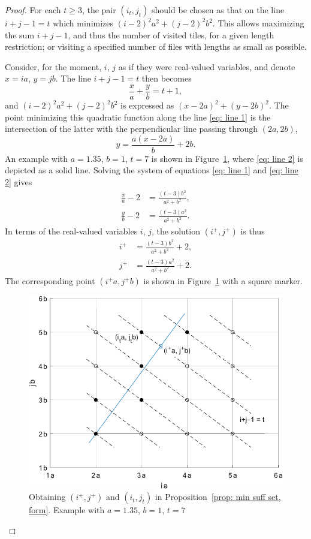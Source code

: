 \documentclass[12pt, a4paper]{article}
\newcommand{\tiles}{t} %
\newcommand{\isolr}{i^+}
\newcommand{\jsolr}{j^+}
\begin{document}
\begin{proof}
For each $\tiles \geq 3$, the pair $(i_\tiles,j_\tiles)$ should be chosen as that on the line $i+j-1=\tiles$ which minimizes $(i-2)^2 a^2 + (j-2)^2 b^2$. This allows maximizing the sum $i+j-1$, and thus the number of visited tiles, for a given length restriction; or visiting a specified number of files with lengths as small as possible.

Consider, for the moment, $i$, $j$ as if they were real-valued variables, and denote $x=ia$, $y=jb$. The line $i+j-1 = \tiles$ then becomes
\begin{equation}
\label{eq: line 1}
\frac x a + \frac y b = \tiles + 1,
\end{equation}
and $(i-2)^2 a^2 + (j-2)^2 b^2$ is expressed as $(x-2a)^2+(y-2b)^2$. The point minimizing this quadratic function along the line \eqref{eq: line 1} is the intersection of the latter with the perpendicular line passing through $(2a,2b)$,
\begin{equation}
\label{eq: line 2}
y = \frac {a (x-2a)} b + 2b.
\end{equation}
An example with $a=1.35$, $b=1$, $\tiles=7$ is shown in Figure~\ref{fig: min suff set, form}, where \eqref{eq: line 2} is depicted as a solid line. Solving the system of equations \eqref{eq: line 1} and \eqref{eq: line 2} gives 
\begin{align}
\frac x a - 2 &= \frac{(\tiles-3)b^2}{a^2+b^2}, \\
\frac y b - 2 &= \frac{(\tiles-3)a^2}{a^2+b^2}.
\end{align}
In terms of the real-valued variables $i$, $j$, the solution $(\isolr, \jsolr)$ is thus
\begin{align}
\label{eq: prop: min suff set, form: isolr}
\isolr &= \frac{(\tiles-3)b^2}{a^2+b^2} + 2, \\
\label{eq: prop: min suff set, form: jsolr}
\jsolr &= \frac{(\tiles-3)a^2}{a^2+b^2} + 2.
\end{align}
The corresponding point $(\isolr a, \jsolr b)$ is shown in Figure~\ref{fig: min suff set, form} with a square marker.

\begin{figure}%
\centering%
\includegraphics[width=.7\textwidth]{mss}%
\caption{Obtaining $(\isolr, \jsolr)$ and $(i_\tiles, j_\tiles)$ in Proposition~\ref{prop: min suff set, form}. Example with $a=1.35$, $b=1$, $\tiles=7$%
}%
\label{fig: min suff set, form}%
\end{figure}%


\end{proof}
\end{document}
